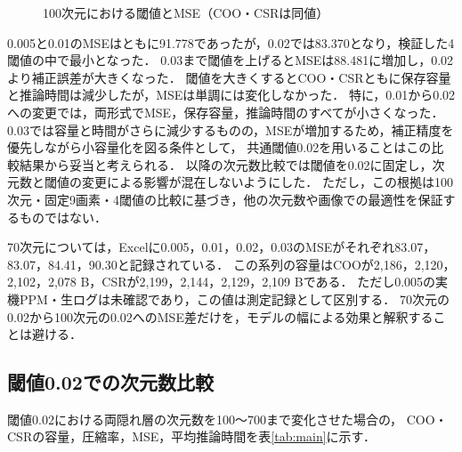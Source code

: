 \documentclass[a4paper,11pt]{article}
\begin{document}
\begin{figure}[H]
\centering
{}
\caption{100次元における閾値とMSE（COO・CSRは同値）}
\label{fig:threshold-mse-100}
\end{figure}
%
0.005と0.01のMSEはともに91.778であったが，0.02では83.370となり，検証した4閾値の中で最小となった．
0.03まで閾値を上げるとMSEは88.481に増加し，0.02より補正誤差が大きくなった．
閾値を大きくするとCOO・CSRともに保存容量と推論時間は減少したが，MSEは単調には変化しなかった．
特に，0.01から0.02への変更では，両形式でMSE，保存容量，推論時間のすべてが小さくなった．
0.03では容量と時間がさらに減少するものの，MSEが増加するため，補正精度を優先しながら小容量化を図る条件として，
共通閾値0.02を用いることはこの比較結果から妥当と考えられる．
以降の次元数比較では閾値を0.02に固定し，次元数と閾値の変更による影響が混在しないようにした．
ただし，この根拠は100次元・固定9画素・4閾値の比較に基づき，他の次元数や画像での最適性を保証するものではない．

70次元については，Excelに0.005，0.01，0.02，0.03のMSEがそれぞれ83.07，83.07，84.41，90.30と記録されている．
この系列の容量はCOOが2,186，2,120，2,102，2,078 B，CSRが2,199，2,144，2,129，2,109 Bである．
ただし0.005の実機PPM・生ログは未確認であり，この値は測定記録として区別する．
70次元の0.02から100次元の0.02へのMSE差だけを，モデルの幅による効果と解釈することは避ける．

\subsection{閾値0.02での次元数比較}
閾値0.02における両隠れ層の次元数を100〜700まで変化させた場合の，
COO・CSRの容量，圧縮率，MSE，平均推論時間を表\ref{tab:main}に示す．
\end{document}
